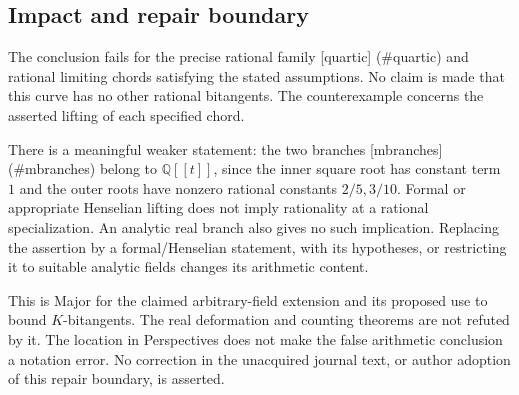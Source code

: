 \documentclass[10pt]{article}
\begin{document}
\subsection*{Impact and repair boundary}
The conclusion fails for the precise rational family [quartic] (\#quartic) and rational limiting chords satisfying the stated assumptions. No claim is made that this curve has no other rational bitangents. The counterexample concerns the asserted lifting of each specified chord.\par
There is a meaningful weaker statement: the two branches [mbranches] (\#mbranches) belong to \(\mathbb Q[[t]]\), since the inner square root has constant term \(1\) and the outer roots have nonzero rational constants \(2/5,3/10\). Formal or appropriate Henselian lifting does not imply rationality at a rational specialization. An analytic real branch also gives no such implication. Replacing the assertion by a formal/Henselian statement, with its hypotheses, or restricting it to suitable analytic fields changes its arithmetic content.\par
This is Major for the claimed arbitrary-field extension and its proposed use to bound \(K\)-bitangents. The real deformation and counting theorems are not refuted by it. The location in Perspectives does not make the false arithmetic conclusion a notation error. No correction in the unacquired journal text, or author adoption of this repair boundary, is asserted.\par
\end{document}
